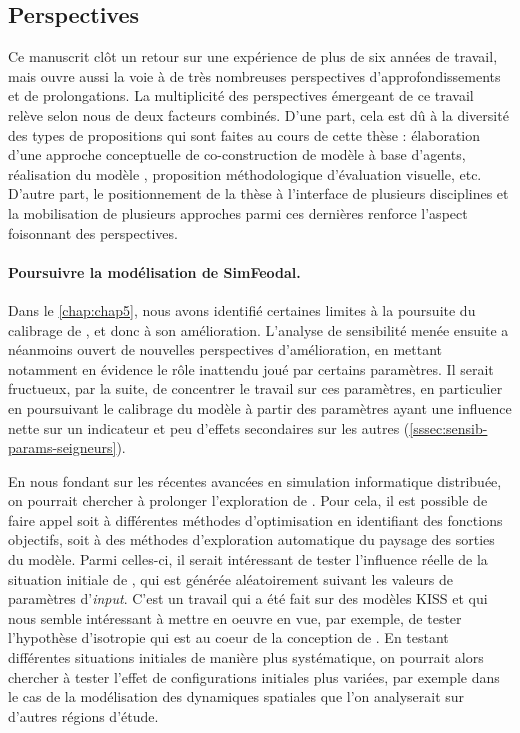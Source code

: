 \subsection*{Perspectives}

Ce manuscrit clôt un retour sur une expérience de plus de six années de travail, mais ouvre aussi la voie à de très nombreuses perspectives d'approfondissements et de prolongations. La multiplicité des perspectives émergeant de ce travail relève selon nous de deux facteurs combinés. D'une part, cela est dû à la diversité des types de propositions qui sont faites au cours de cette thèse : élaboration d'une approche conceptuelle de co-construction de modèle à base d'agents, réalisation du modèle \simfeodal{}, proposition méthodologique d'évaluation visuelle, etc. D'autre part, le positionnement de la thèse à l'interface de plusieurs disciplines et la mobilisation de plusieurs approches parmi ces dernières renforce l'aspect foisonnant des perspectives. 

\paragraph{Poursuivre la modélisation de SimFeodal.}
Dans le \cref{chap:chap5}, nous avons identifié certaines limites à la poursuite du calibrage de \simfeodal{}, et donc à son amélioration. L'analyse de sensibilité menée ensuite a néanmoins ouvert de nouvelles perspectives d'amélioration, en mettant notamment en évidence le rôle inattendu joué par certains paramètres. Il serait fructueux, par la suite, de concentrer le travail sur ces paramètres, en particulier en poursuivant le calibrage du modèle à partir des paramètres ayant une influence nette sur un indicateur et peu d'effets secondaires sur les autres (\cref{sssec:sensib-params-seigneurs}). 

En nous fondant sur les récentes avancées en simulation informatique distribuée, on pourrait chercher à prolonger l'exploration de \simfeodal{}. Pour cela, il est possible de faire appel soit à différentes méthodes d'optimisation en identifiant des \og fonctions objectifs\fg{}, soit à des méthodes d'exploration automatique du paysage des sorties du modèle. Parmi celles-ci, il serait intéressant de tester l'influence réelle de la situation initiale de \simfeodal{}, qui est générée aléatoirement suivant les valeurs de paramètres d'\textit{input}. C'est un travail qui a été fait sur des modèles KISS \autocite{raimbault_space_2019} et qui nous semble intéressant à mettre en oeuvre en vue, par exemple, de tester l'hypothèse d'isotropie qui est au coeur de la conception de \simfeodal{}. En testant différentes situations initiales de manière plus systématique, on pourrait alors chercher à tester l'effet de configurations initiales plus variées, par exemple dans le cas de la modélisation des dynamiques spatiales que l'on analyserait sur d'autres régions d'étude.

